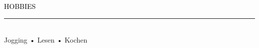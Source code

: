 {\setmainfont{Rubik Medium}\fontsize{11}{14}\selectfont\textcolor{black}{HOBBIES}}
\\[-4pt]
\textcolor{black}{\rule{\textwidth}{2pt}}\\

Jogging • Lesen • Kochen

\vspace{0.7em}


